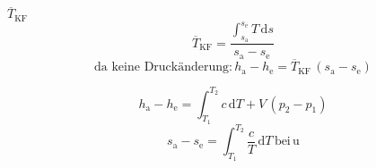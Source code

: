 \( \overline{T}_{\text{KF}} \)  
\[ \overline{T}_{\text{KF}} = \frac{\int_{s_{\text{a}}}^{s_{\text{e}}} T \, \text{d}s}{s_{\text{a}} - s_{\text{e}}} \]  
\[ \text{da keine Druckänderung:} \, h_{\text{a}} - h_{\text{e}} = \overline{T}_{\text{KF}} \, (s_{\text{a}} - s_{\text{e}}) \]  

\[ h_{\text{a}} - h_{\text{e}} = \int_{T_1}^{T_2} c \, \text{d}T + V \, (p_2 - p_1) \]  
\[ s_{\text{a}} - s_{\text{e}} = \int_{T_1}^{T_2} \frac{c}{T} \, \text{d}T \, \text{bei} \, \text{u} \]